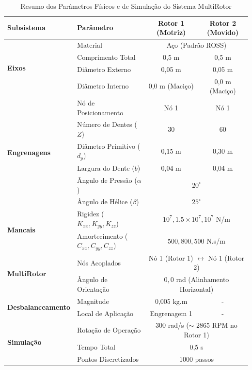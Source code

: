 \documentclass[10pt,fleqn,a4paper,twoside]{article}
\begin{document}
	\begin{table}[H] %
		\centering
		\caption{Resumo dos Parâmetros Físicos e de Simulação do Sistema MultiRotor}
		\label{tab:parametros_multirotor}
		\renewcommand{\arraystretch}{1.2} %
		\begin{tabular}{@{}llcc@{}}
			\toprule
			\textbf{Subsistema} & \textbf{Parâmetro} & \textbf{Rotor 1 (Motriz)} & \textbf{Rotor 2 (Movido)} \\ \midrule
			
			\multirow{4}{*}{\textbf{Eixos}} 
			& Material & \multicolumn{2}{c}{Aço (Padrão ROSS)} \\
			& Comprimento Total & 0,5 m & 0,5 m \\
			& Diâmetro Externo & 0,05 m & 0,05 m \\
			& Diâmetro Interno & 0,0 m (Maciço) & 0,0 m (Maciço) \\ \midrule
			
			\multirow{6}{*}{\textbf{Engrenagens}} 
			& Nó de Posicionamento & Nó 1 & Nó 1 \\
			& Número de Dentes ($Z$) & 30 & 60 \\
			& Diâmetro Primitivo ($d_p$) & 0,15 m & 0,30 m \\
			& Largura do Dente ($b$) & 0,04 m & 0,04 m \\
			& Ângulo de Pressão ($\alpha$) & \multicolumn{2}{c}{$20^\circ$} \\
			& Ângulo de Hélice ($\beta$) & \multicolumn{2}{c}{$25^\circ$} \\ \midrule
			
			\multirow{2}{*}{\textbf{Mancais}} 
			& Rigidez ($K_{xx}, K_{yy}, K_{zz}$) & \multicolumn{2}{c}{$10^7, 1.5 \times 10^7, 10^7$ N/m} \\
			& Amortecimento ($C_{xx}, C_{yy}, C_{zz}$) & \multicolumn{2}{c}{$500, 800, 500$ N.s/m} \\ \midrule
			
			\multirow{2}{*}{\textbf{MultiRotor}} 
			& Nós Acoplados & \multicolumn{2}{c}{Nó 1 (Rotor 1) $\leftrightarrow$ Nó 1 (Rotor 2)} \\
			& Ângulo de Orientação & \multicolumn{2}{c}{$0,0$ rad (Alinhamento Horizontal)} \\ \midrule
			
			\multirow{2}{*}{\textbf{Desbalanceamento}} 
			& Magnitude & 0,005 kg.m & - \\
			& Local de Aplicação & Engrenagem 1 & - \\ \midrule
			
			\multirow{3}{*}{\textbf{Simulação}} 
			& Rotação de Operação & \multicolumn{2}{c}{300 rad/s ($\sim$ 2865 RPM no Rotor 1)} \\
			& Tempo Total & \multicolumn{2}{c}{0,5 s} \\
			& Pontos Discretizados & \multicolumn{2}{c}{1000 passos} \\ 
			\bottomrule
		\end{tabular}
	\end{table}
	
\end{document}
